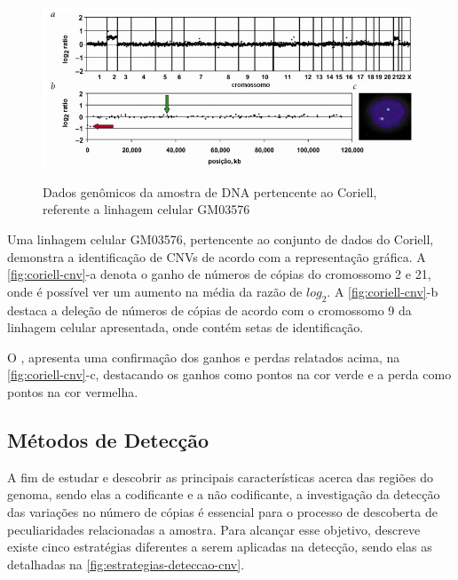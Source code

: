 \begin{figure}[!htb]
    \centering
    \caption{Dados genômicos da amostra de DNA pertencente ao Coriell, referente a linhagem celular GM03576}
    \includegraphics[width=1\textwidth]{./dados/figuras/coriell-cnv}
    \label{fig:coriell-cnv}
\end{figure}

Uma linhagem celular GM03576, pertencente ao conjunto de dados do Coriell, demonstra a identificação de CNVs de acordo com a representação gráfica. A \autoref{fig:coriell-cnv}-a denota o ganho de números de cópias do cromossomo 2 e 21, onde é possível ver um aumento na média da razão de $log_{2}$. A \autoref{fig:coriell-cnv}-b destaca a deleção de números de cópias de acordo com o cromossomo 9 da linhagem celular apresentada, onde contém setas de identificação. 

O \cite{Snijders2001}, apresenta uma confirmação dos ganhos e perdas relatados acima, na \autoref{fig:coriell-cnv}-c, destacando os ganhos como pontos na cor verde e a perda como pontos na cor vermelha.

\subsection{Métodos de Detecção} 

A fim de estudar e descobrir as principais características acerca das regiões do genoma, sendo elas a codificante e a não codificante, a investigação da detecção das variações no número de cópias é essencial para o processo de descoberta de peculiaridades relacionadas a amostra. Para alcançar esse objetivo, \cite{Zhao2013} descreve existe cinco estratégias diferentes a serem aplicadas na detecção, sendo elas as detalhadas na \autoref{fig:estrategias-deteccao-cnv}.

